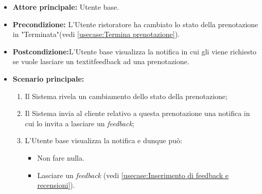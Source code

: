 \label{usecase:Visualizzazione della notifica di richiesta di inserimento feedback}
\begin{itemize}
	\item \textbf{Attore principale:} Utente base.

	
	\item \textbf{Precondizione:} L'Utente ristoratore ha cambiato lo stato della prenotazione in "Terminata"(vedi \autoref{usecase:Termina prenotazione}).

    
	\item \textbf{Postcondizione:}L'Utente base visualizza la notifica in cui gli viene richiesto se vuole lasciare un textit{feedback} ad una prenotazione.
     
	\item \textbf{Scenario principale:}
	      \begin{enumerate}
                \item Il Sistema rivela un cambiamento dello stato della prenotazione;
                \item Il Sistema invia al cliente relativo a questa prenotazione una notifica in cui lo invita a lasciare un \textit{feedback};
                \item L'Utente base visualizza la notifica e dunque può:
                \begin{itemize}
                    \item Non fare nulla.
                    \item Lasciare un \textit{feedback} (vedi \autoref{usecase:Inserimento di feedback e recensioni}).
                \end{itemize}
	      \end{enumerate}
\end{itemize}